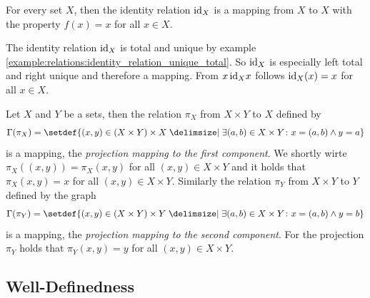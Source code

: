 \begin{examples}
    \begin{exampleenumerate}
        \item For every set $X$, then the identity relation $\text{id}_X$ is a mapping from $X$ to $X$ with the property $f(x)=x$ for all $x\in X$.
        \begin{miniproof}
            The identity relation $\text{id}_X$ is total and unique by example \ref{example:relations:identity_relation_unique_total}. So $\text{id}_X$ is especially left total and right unique and therefore a mapping. From $x\,\text{id}_X x$ follows $\text{id}_X(x)=x$ for all $x\in X$.
        \end{miniproof}
        \item\label{example:mappings:projection_mappings} Let $X$ and $Y$ be a sets, then the relation $\pi_X$ from $X\times Y$ to $X$ defined by
        \begin{align}\Gamma(\pi_X)=\setdef{(x,y)\in (X\times Y)\times X\given \exists (a,b)\in X\times Y\colon x=(a,b)\land y=a}\end{align}
        is a mapping, the \emph{projection mapping to the first component}. We shortly wirte $\pi_X((x,y))=\pi_X(x,y)$ for all $(x,y)\in X\times Y$ and it holds that $\pi_X(x,y)=x$ for all $(x,y)\in X\times Y$. Similarly the relation $\pi_Y$ from $X\times Y$ to $Y$ defined by the graph
        \begin{align}\Gamma(\pi_Y)=\setdef{(x,y)\in (X\times Y)\times Y\given \exists (a,b)\in X\times Y\colon x=(a,b)\land y=b}\end{align}
        is a mapping, the \emph{projection mapping to the second component}. For the projection $\pi_Y$ holds that $\pi_Y(x,y)=y$ for all $(x,y)\in X\times Y$.
        \begin{miniproof}
        \end{miniproof}
    \end{exampleenumerate}
\end{examples}

\subsection{Well-Definedness}

